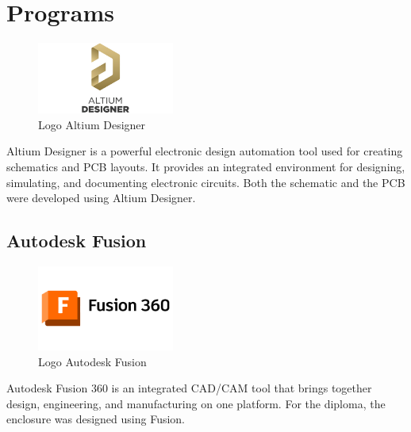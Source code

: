 \section{Programs}

\begin{figure}[h]
\centering
\includegraphics[width=0.4\textwidth]{assets/Altium Designer.png}
\caption{Logo Altium Designer}
\end{figure}

Altium Designer is a powerful electronic design automation tool used for creating schematics and PCB layouts. It provides an integrated environment for designing, simulating, and documenting electronic circuits. Both the schematic and the PCB were developed using Altium Designer.

\subsection{Autodesk Fusion}

\begin{figure}[h]
\centering
\includegraphics[width=0.4\textwidth]{assets/Autodesk Fusion.png}
\caption{Logo Autodesk Fusion}
\end{figure}

Autodesk Fusion 360 is an integrated CAD/CAM tool that brings together design, engineering, and manufacturing on one platform. For the diploma, the enclosure was designed using Fusion.